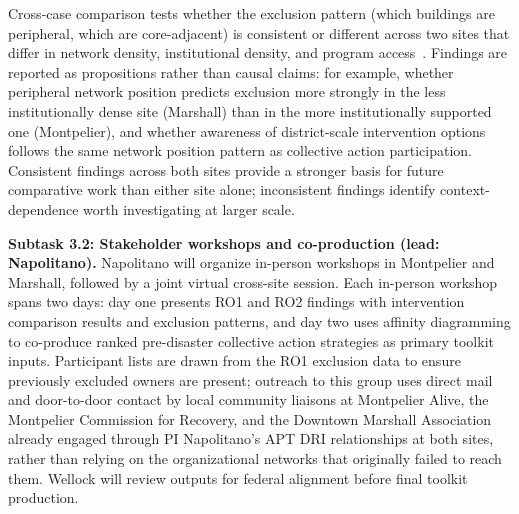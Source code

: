 \documentclass[11pt]{article}
\begin{document}
Cross-case comparison tests whether the exclusion pattern (which buildings are
peripheral, which are core-adjacent) is consistent or different across two sites
that differ in network density, institutional density, and program
access~\cite{chi2012impacts}.
Findings are reported as propositions rather than causal claims: for example,
whether peripheral network position predicts exclusion more strongly in the
less institutionally dense site (Marshall) than in the more institutionally
supported one (Montpelier), and whether awareness of district-scale intervention
options follows the same network position pattern as collective action participation.
Consistent findings across both sites provide a stronger basis for future
comparative work than either site alone; inconsistent findings identify
context-dependence worth investigating at larger scale.

\textbf{Subtask 3.2: Stakeholder workshops and co-production (lead: Napolitano).}
Napolitano will organize in-person workshops in Montpelier and Marshall, followed
by a joint virtual cross-site session.
Each in-person workshop spans two days: day one presents RO1 and RO2 findings
with intervention comparison results and exclusion patterns, and day two uses
affinity diagramming to co-produce ranked pre-disaster collective action strategies
as primary toolkit inputs.
Participant lists are drawn from the RO1 exclusion data to ensure previously
excluded owners are present; outreach to this group uses direct mail and
door-to-door contact by local community liaisons at Montpelier Alive, the
Montpelier Commission for Recovery, and the Downtown Marshall Association already
engaged through PI Napolitano's APT DRI relationships at both sites, rather than
relying on the organizational networks that originally failed to reach them.
Wellock will review outputs for federal alignment before final toolkit production.
\end{document}
